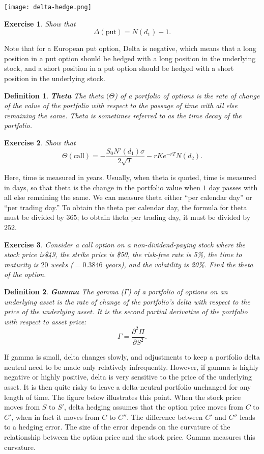 \documentclass[letterpaper,10pt]{article}
\newtheorem{df}{Definition}[section]
\newtheorem{ex}{Exercise}
\begin{document}
\texttt{[image: delta-hedge.png]}

\begin{ex}
Show that $$\Delta(\text{put})=N(d_1)-1.$$
\end{ex}

\noindent Note that for a European put option, Delta is negative, which means that a long position in a put option should be hedged
with a long position in the underlying stock, and a short position in a put option
should be hedged with a short position in the underlying stock.

\begin{df}{\bf Theta}
The theta $(\Theta$) of a portfolio of options is the rate of change of the value of the portfolio
with respect to the passage of time with all else remaining the same. Theta is sometimes
referred to as the time decay of the portfolio.
\end{df}

\begin{ex}
Show that $$\Theta(\text{call})=-\frac{S_0N'(d_1)\sigma}{2\sqrt{T}}-rKe^{-rT}N(d_2).$$

\end{ex}

\noindent Here, time is measured in years. Usually, when theta is quoted, time is
measured in days, so that theta is the change in the portfolio value when $1$ day passes
with all else remaining the same. We can measure theta either ``per calendar day” or
``per trading day.” To obtain the theta per calendar day, the formula for theta must be
divided by $365$; to obtain theta per trading day, it must be divided by $252$.


\begin{ex}
Consider a call option on a non-dividend-paying stock where
the stock price is\$49, the strike price is \$50, the risk-free rate is 5\%, the time to
maturity is $20$ weeks ($= 0.3846$ years), and the volatility is 20\%.  Find the theta of the option.
\end{ex}

\begin{df}{\bf Gamma}
The gamma ($\Gamma$) of a portfolio of options on an underlying asset is the rate of change of
the portfolio’s delta with respect to the price of the underlying asset. It is the second
partial derivative of the portfolio with respect to asset price:
$$\Gamma=\frac{\partial^2\Pi}{\partial S^2}.$$
\end{df}

\noindent If gamma is small, delta changes slowly, and adjustments to keep a portfolio delta
neutral need to be made only relatively infrequently. However, if gamma is highly
negative or highly positive, delta is very sensitive to the price of the underlying asset. It
is then quite risky to leave a delta-neutral portfolio unchanged for any length of time.
The figure below illustrates this point. When the stock price moves from $S$ to $S'$, delta
hedging assumes that the option price moves from $C$ to $C'$, when in fact it moves from
$C$ to $C''$. The difference between $C'$ and $C''$ leads to a hedging error. The size of the
error depends on the curvature of the relationship between the option price and the
stock price. Gamma measures this curvature.
\end{document}
